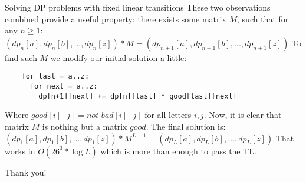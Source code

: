 \documentclass{beamer}
\begin{document}
\begin{frame}[fragile]{Solving DP problems with fixed linear transitions}
  These two observations combined provide a useful property: 
  \newline
  there exists some matrix $M$, such that for any $n \geq 1$:
  $(dp_n[a], dp_n[b], ..., dp_n[z]) * M = (dp_{n+1}[a], dp_{n+1}[b], ..., dp_{n+1}[z])$
  \newline
  To find such $M$ we modify our initial solution a little:
  \begin{lstlisting}
    for last = a..z:
      for next = a..z:
        dp[n+1][next] += dp[n][last] * good[last][next]
  \end{lstlisting}
  Where $good[i][j] = not$ $bad[i][j]$ for all letters $i,j$.
  \newline
  Now, it is clear that matrix $M$ is nothing but a matrix $good$.
  \newline
  The final solution is: 
  \newline 
  $(dp_1[a], dp_1[b], ..., dp_1[z]) * M^{L-1} = (dp_L[a], dp_L[b], ..., dp_L[z])$
  \newline That works in $O(26^3 * \log{L})$ which is more than enough to pass the TL.
\end{frame}

\begin{frame}{}
                \LARGE{\centerline{Thank you!}}
\end{frame}
\end{document}
